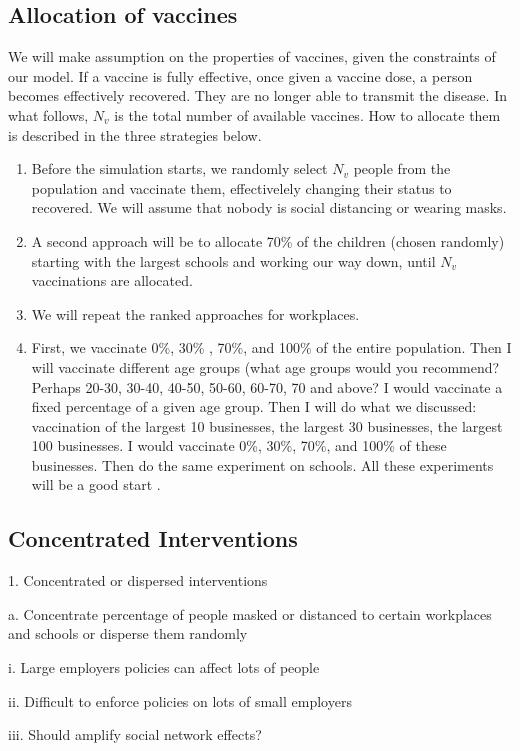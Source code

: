 \documentclass{article}
\begin{document}
\subsection{Allocation of vaccines}
We will make assumption on the properties of vaccines, given the constraints of our model. If a vaccine is fully effective, once given a vaccine dose, a person becomes effectively recovered. They are no longer able to transmit the disease. In what follows, $N_v$ is the total number of available vaccines. How to allocate them is described in the three strategies below. 
\begin{enumerate}
\item Before the simulation starts, we randomly select $N_v$ people from the population and vaccinate them, effectivelely changing their status to recovered. We will assume that nobody is social distancing or wearing masks. 
\item A second approach will be to allocate 70\% of the children (chosen randomly) starting with the largest schools and working our way down, until $N_v$ vaccinations are allocated. 
\item We will repeat the ranked approaches for workplaces. 
\item
First, we vaccinate  0\%, 30\% , 70\%, and 100\% of the entire population. Then I will vaccinate different age groups (what age groups would you recommend? Perhaps 20-30, 30-40, 40-50, 50-60, 60-70, 70 and above? I would vaccinate a fixed percentage of a given age group. Then I will do what we discussed: vaccination of the largest 10 businesses, the largest 30 businesses, the largest 100 businesses. I would vaccinate 0\%, 30\%, 70\%, and 100\% of these businesses. Then do the same experiment on schools. All these experiments will be a good start .
\end{enumerate}

\subsection{Concentrated Interventions}
1.	Concentrated or dispersed interventions

a.	Concentrate percentage of people masked or distanced to certain workplaces and schools or disperse them randomly

i.	Large employers policies can affect lots of people

ii.	Difficult to enforce policies on lots of small employers

iii.	Should amplify social network effects?
\end{document}
